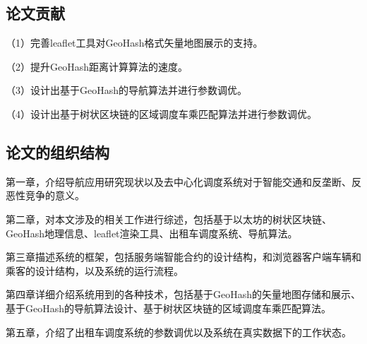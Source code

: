 \subsection{论文贡献}
（1）完善leaflet工具对GeoHash格式矢量地图展示的支持。\par
（2）提升GeoHash距离计算算法的速度。\par
（3）设计出基于GeoHash的导航算法并进行参数调优。\par
（4）设计出基于树状区块链的区域调度车乘匹配算法并进行参数调优。
\subsection{论文的组织结构}
第一章，介绍导航应用研究现状以及去中心化调度系统对于智能交通和反垄断、反恶性竞争的意义。\par
第二章，对本文涉及的相关工作进行综述，包括基于以太坊的树状区块链、GeoHash地理信息、leaflet渲染工具、出租车调度系统、导航算法。\par
第三章描述系统的框架，包括服务端智能合约的设计结构，和浏览器客户端车辆和乘客的设计结构，以及系统的运行流程。\par
第四章详细介绍系统用到的各种技术，包括基于GeoHash的矢量地图存储和展示、基于GeoHash的导航算法设计、基于树状区块链的区域调度车乘匹配算法。\par
第五章，介绍了出租车调度系统的参数调优以及系统在真实数据下的工作状态。